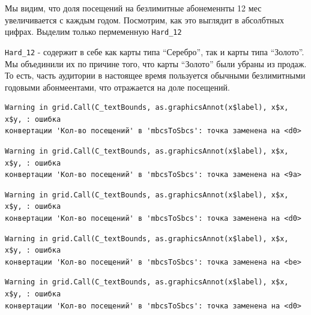 \documentclass[
  letterpaper,
  DIV=11,
  numbers=noendperiod]{scrreprt}
\begin{document}
Мы видим, что доля посещений на безлимитные абонеменнты 12 мес
увеличивается с каждым годом. Посмотрим, как это выглядит в абсолбтных
цифрах. Выделим только пермеменную \texttt{Hard\_12}

\begin{tcolorbox}[enhanced jigsaw, breakable, arc=.35mm, colback=white, left=2mm, colframe=quarto-callout-important-color-frame, toprule=.15mm, bottomrule=.15mm, leftrule=.75mm, opacityback=0, rightrule=.15mm]
\begin{minipage}[t]{5.5mm}
\textcolor{quarto-callout-important-color}{\faExclamation}
\end{minipage}%
\begin{minipage}[t]{\textwidth - 5.5mm}
\texttt{Hard\_12} - содержит в себе как карты типа ``Серебро'', так и
карты типа ``Золото''. Мы объединили их по причине того, что карты
``Золото'' были убраны из продаж. То есть, часть аудитории в настоящее
время пользуется обычными безлимитными годовыми абонмеентами, что
отражается на доле посещений.\end{minipage}%
\end{tcolorbox}

\begin{verbatim}
Warning in grid.Call(C_textBounds, as.graphicsAnnot(x$label), x$x, x$y, : ошибка
конвертации 'Кол-во посещений' в 'mbcsToSbcs': точка заменена на <d0>
\end{verbatim}

\begin{verbatim}
Warning in grid.Call(C_textBounds, as.graphicsAnnot(x$label), x$x, x$y, : ошибка
конвертации 'Кол-во посещений' в 'mbcsToSbcs': точка заменена на <9a>
\end{verbatim}

\begin{verbatim}
Warning in grid.Call(C_textBounds, as.graphicsAnnot(x$label), x$x, x$y, : ошибка
конвертации 'Кол-во посещений' в 'mbcsToSbcs': точка заменена на <d0>
\end{verbatim}

\begin{verbatim}
Warning in grid.Call(C_textBounds, as.graphicsAnnot(x$label), x$x, x$y, : ошибка
конвертации 'Кол-во посещений' в 'mbcsToSbcs': точка заменена на <be>
\end{verbatim}

\begin{verbatim}
Warning in grid.Call(C_textBounds, as.graphicsAnnot(x$label), x$x, x$y, : ошибка
конвертации 'Кол-во посещений' в 'mbcsToSbcs': точка заменена на <d0>
\end{verbatim}
\end{document}
